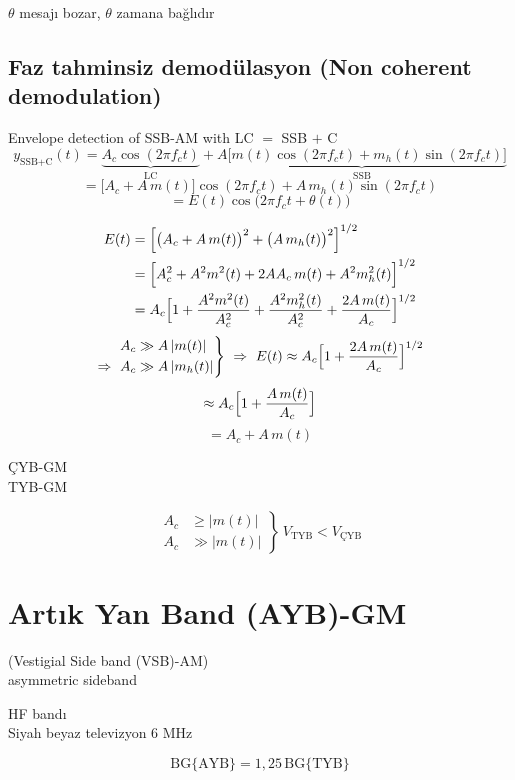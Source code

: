 \documentclass[11pt,a4paper]{article}
\begin{document}
$\theta$ mesajı bozar, $\theta$ zamana bağlıdır

\subsection{Faz tahminsiz demodülasyon (Non coherent demodulation)}
Envelope detection of SSB-AM with LC $=$ SSB $+$ C
\[ y_{\text{SSB+C}}(t)=\underbrace{A_c\cos(2\pi f_c t)}_{\text{LC}}+\underbrace{A\bigl[m(t)\cos(2\pi f_c t)+m_h(t)\sin(2\pi f_c t)\bigr]}_{\text{SSB}} \]
\[ =\bigl[A_c+A\,m(t)\bigr]\cos(2\pi f_c t)+A\,m_h(t)\sin(2\pi f_c t) \]
\[ =E(t)\cos\bigl(2\pi f_c t+\theta(t)\bigr) \]

\begin{align*}
E(t)&=\Bigl[\bigl(A_c+A\,m(t)\bigr)^2+\bigl(A\,m_h(t)\bigr)^2\Bigr]^{1/2}\\
&=\Bigl[A_c^2+A^2m^2(t)+2AA_c\,m(t)+A^2m_h^2(t)\Bigr]^{1/2}\\
&=A_c\Bigl[1+\frac{A^2m^2(t)}{A_c^2}+\frac{A^2m_h^2(t)}{A_c^2}+\frac{2A\,m(t)}{A_c}\Bigr]^{1/2}
\end{align*}
\[ \left.\begin{aligned}A_c&\gg A\,|m(t)|\\ \Rightarrow\ A_c&\gg A\,|m_h(t)|\end{aligned}\right\}\ \Rightarrow\ E(t)\approx A_c\Bigl[1+\frac{2A\,m(t)}{A_c}\Bigr]^{1/2} \]
\[ \approx A_c\Bigl[1+\frac{A\,m(t)}{A_c}\Bigr] \]
\[ =A_c+A\,m(t) \]

\noindent
\begin{minipage}[c]{0.26\linewidth}
{\color{kirmizikalem}ÇYB-GM\\[3mm] TYB-GM}
\end{minipage}
\begin{minipage}[c]{0.7\linewidth}
\[ \left.\begin{aligned}A_c&\ge|m(t)|\\ A_c&\gg|m(t)|\end{aligned}\right\}\ V_{\text{TYB}}<V_{\text{ÇYB}} \]
\end{minipage}

\section{Artık Yan Band (AYB)-GM}
{\color{kirmizikalem}(Vestigial Side band (VSB)-AM)\\ {\small asymmetric sideband}}
\begin{flushright}
{\color{turuncukalem}HF bandı}\\[2mm]
Siyah beyaz televizyon 6 MHz
\end{flushright}
\[ \mathrm{BG}\{\text{AYB}\}=1{,}25\,\mathrm{BG}\{\text{TYB}\} \]
\end{document}
